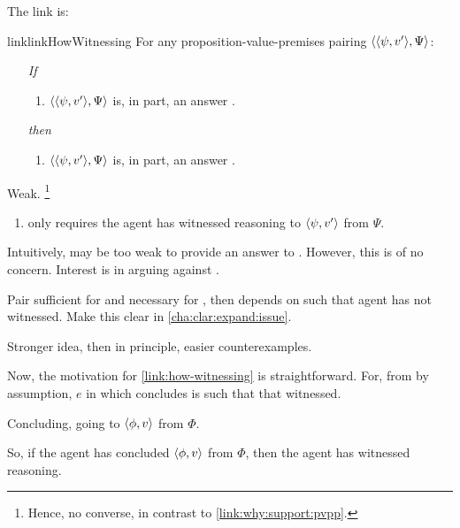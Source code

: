 \begin{note}
  The link is:

  \begin{restatable}{link}{linkHowWitnessing}
    \label{link:how-witnessing}
    For any proposition-value-premises pairing \(\langle \langle \psi, v' \rangle, \Psi \rangle\):
    \begin{itemize}
    \item[\emph{If}]
      \begin{enumerate}[label=\alph*., ref=(\alph*)]
      \item
        \(\langle \langle \psi, v' \rangle, \Psi \rangle\) is, in part, an answer \qHow{}.
      \end{enumerate}
    \item[\emph{then}]
      \begin{enumerate}[label=\alph*., ref=(\alph*), resume]
      \item
        \(\langle \langle \psi, v' \rangle, \Psi \rangle\) is, in part, an answer \qHowV{}.
      \end{enumerate}
    \end{itemize}
    \vspace{-\baselineskip}
  \end{restatable}

  Weak.%
  \footnote{
    Hence, no converse, in contrast to \autoref{link:why:support:pvpp}.
  }
  \begin{enumerate}
  \item
    \qHowV{} only requires the agent has witnessed reasoning to \(\langle \psi, v' \rangle\) from \(\Psi\).
  \end{enumerate}

  Intuitively, may be too weak to provide an answer to \qWhy{}.
  However, this is of no concern.
  Interest is in arguing against \issueInclusion{}.

  Pair sufficient for \qWhy{} and necessary for \qHow{}, then depends on \support{} such that agent has not witnessed.
  Make this clear in \autoref{cha:clar:expand:issue}.

  Stronger idea, then in principle, easier counterexamples.
\end{note}

\begin{note}
  Now, the motivation for \autoref{link:how-witnessing} is straightforward.
  For, from by assumption, \(e\) in which concludes is such that that witnessed.

  Concluding, going to \(\langle \phi, v \rangle\) from \(\Phi\).

  So, if the agent has concluded \(\langle \phi, v \rangle\) from \(\Phi\), then the agent has witnessed reasoning.
\end{note}

